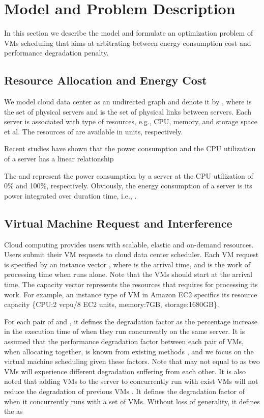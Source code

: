 \documentclass[10pt,journal]{IEEEtran}
\begin{document}
\section{Model and Problem Description}
\label{sec:model}
In this section we describe the model and formulate an optimization problem of VMs scheduling that aims at arbitrating between energy consumption cost and performance degradation penalty.

\subsection{Resource Allocation and Energy Cost}
We model cloud data center as an undirected graph and denote it by , where   is the set of physical servers and  is the set of physical links between servers. Each server  is associated with  type of resources, e.g., CPU, memory, and storage space et al. The resources of  are available in   units, respectively.

Recent studies \cite{Kusic09, Fan07} have shown that the power consumption  and the CPU utilization  of a server has a linear relationship

The  and  represent the power consumption by a server at the CPU utilization of 0\% and 100\%, respectively. Obviously, the energy consumption of a server is its power integrated over duration time, i.e., .

\subsection{Virtual Machine Request and Interference}
Cloud computing provides users with scalable, elastic and on-demand resources. Users submit their VM requests to cloud data center scheduler. Each VM request  is specified by an instance vector , where  is the arrival time, and  is the work of processing time when  runs alone. Note that the VMs should start at the arrival time. The capacity vector   represents the resources that  requires for processing its work. For example, an instance type of VM in Amazon EC2 \cite{Amazon} specifics its resource capacity \{CPU:2 vcpu/8 EC2 units, memory:7GB, storage:1680GB\}.

For each pair of  and , it defines the degradation factor  as the percentage increase in the execution time of  when they run concurrently on the same server. It is assumed that the performance degradation factor  between each pair of VMs, when allocating together, is known from existing methods \cite{Govindan11, Mars11, Roytman13, Verboven13, Koh07}, and we focus on the virtual machine scheduling given these factors. Note that  may not equal to  as two VMs will experience different degradation suffering from each other. It is also noted that adding VMs to the server to concurrently run with exist VMs will not reduce the degradation of previous VMs \cite{Roytman13}. It defines the degradation factor  of  when it concurrently runs with a set  of VMs. Without loss of generality, it defines the  as
\end{document}
